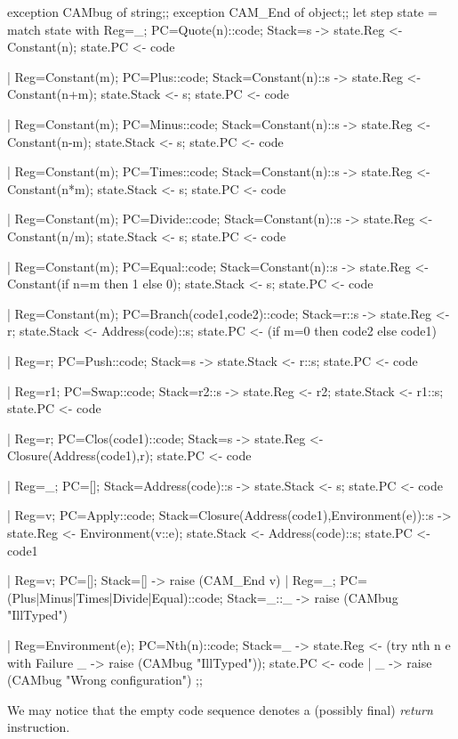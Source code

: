 \begin{caml_example}
exception CAMbug of string;;
exception CAM_End of object;;
let step state = match state with
  {Reg=_; PC=Quote(n)::code; Stack=s} ->
                state.Reg <- Constant(n); state.PC <- code

| {Reg=Constant(m); PC=Plus::code; Stack=Constant(n)::s} ->
                state.Reg <- Constant(n+m); state.Stack <- s;
                state.PC <- code

| {Reg=Constant(m); PC=Minus::code; Stack=Constant(n)::s} ->
                state.Reg <- Constant(n-m); state.Stack <- s;
                state.PC <- code

| {Reg=Constant(m); PC=Times::code; Stack=Constant(n)::s} ->
                state.Reg <- Constant(n*m); state.Stack <- s;
                state.PC <- code

| {Reg=Constant(m); PC=Divide::code; Stack=Constant(n)::s} ->
                state.Reg <- Constant(n/m); state.Stack <- s;
                state.PC <- code

| {Reg=Constant(m); PC=Equal::code; Stack=Constant(n)::s} ->
                state.Reg <- Constant(if n=m then 1 else 0);
                state.Stack <- s; state.PC <- code

| {Reg=Constant(m); PC=Branch(code1,code2)::code; Stack=r::s} ->
                state.Reg <- r;
                state.Stack <- Address(code)::s;
                state.PC <- (if m=0 then code2 else code1)

| {Reg=r; PC=Push::code; Stack=s} ->
                state.Stack <- r::s; state.PC <- code

| {Reg=r1; PC=Swap::code; Stack=r2::s} ->
                state.Reg <- r2; state.Stack <- r1::s;
                state.PC <- code

| {Reg=r; PC=Clos(code1)::code; Stack=s} ->
                state.Reg <- Closure(Address(code1),r);
                state.PC <- code

| {Reg=_; PC=[]; Stack=Address(code)::s} ->
                state.Stack <- s; state.PC <- code

| {Reg=v; PC=Apply::code;
          Stack=Closure(Address(code1),Environment(e))::s} ->
                state.Reg <- Environment(v::e);
                state.Stack <- Address(code)::s;
                state.PC <- code1

| {Reg=v; PC=[]; Stack=[]} ->
                raise (CAM_End v)
| {Reg=_; PC=(Plus|Minus|Times|Divide|Equal)::code; Stack=_::_} ->
                raise (CAMbug "IllTyped")

| {Reg=Environment(e); PC=Nth(n)::code; Stack=_} ->
                state.Reg <- (try nth n e
                              with Failure _ -> raise (CAMbug "IllTyped"));
                state.PC <- code
| _ -> raise (CAMbug "Wrong configuration")
;;
\end{caml_example}
We may notice that the empty code sequence denotes a (possibly final)
{\em return} instruction.

